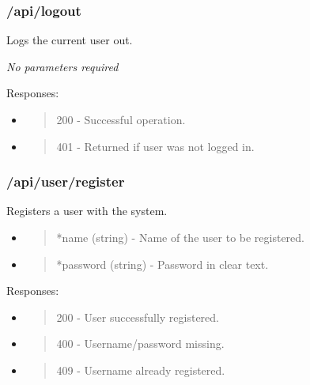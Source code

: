 \hypertarget{apilogout}{%
\subsubsection{/api/logout}\label{apilogout}}

Logs the current user out.

\emph{No parameters required}

Responses:

\begin{itemize}
\item
  \begin{quote}
  200 - Successful operation.
  \end{quote}
\item
  \begin{quote}
  401 - Returned if user was not logged in.
  \end{quote}
\end{itemize}

\hypertarget{apiuserregister}{%
\subsubsection{/api/user/register}\label{apiuserregister}}

Registers a user with the system.

\begin{itemize}
\item
  \begin{quote}
  *name (string) - Name of the user to be registered.
  \end{quote}
\item
  \begin{quote}
  *password (string) - Password in clear text.
  \end{quote}
\end{itemize}

Responses:

\begin{itemize}
\item
  \begin{quote}
  200 - User successfully registered.
  \end{quote}
\item
  \begin{quote}
  400 - Username/password missing.
  \end{quote}
\item
  \begin{quote}
  409 - Username already registered.
  \end{quote}
\end{itemize}

